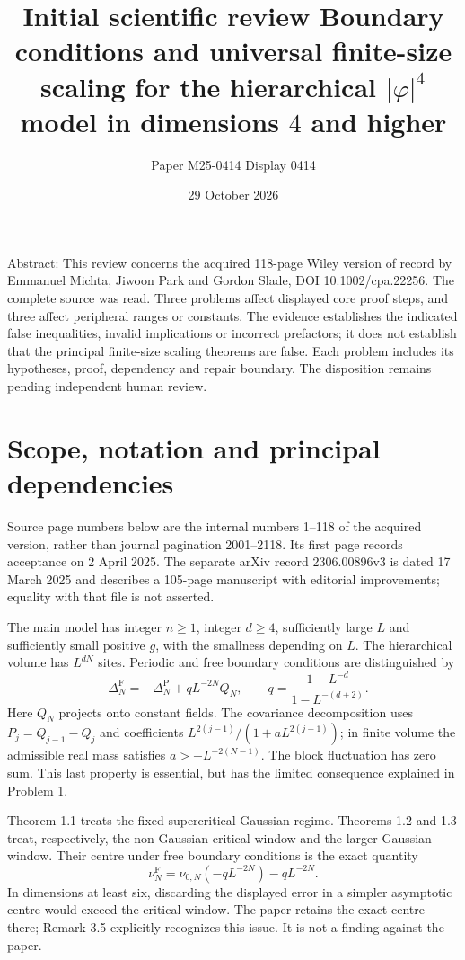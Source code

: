 \documentclass[10pt]{article}
\title{Initial scientific review
Boundary conditions and universal finite-size scaling
for the hierarchical \(|\varphi|^4\) model
in dimensions \(4\) and higher}
\author{Paper M25-0414 Display 0414}
\date{29 October 2026}
\begin{document}
\maketitle
Abstract: This review concerns the acquired 118-page Wiley version of record by Emmanuel Michta, Jiwoon Park and Gordon Slade, DOI 10.1002/cpa.22256. The complete source was read. Three problems affect displayed core proof steps, and three affect peripheral ranges or constants. The evidence establishes the indicated false inequalities, invalid implications or incorrect prefactors; it does not establish that the principal finite-size scaling theorems are false. Each problem includes its hypotheses, proof, dependency and repair boundary. The disposition remains pending independent human review.\par
\section*{Scope, notation and principal dependencies}
Source page numbers below are the internal numbers 1–118 of the acquired version, rather than journal pagination 2001–2118. Its first page records acceptance on 2 April 2025. The separate arXiv record 2306.00896v3 is dated 17 March 2025 and describes a 105-page manuscript with editorial improvements; equality with that file is not asserted.\par
The main model has integer \(n\geq1\), integer \(d\geq4\), sufficiently large \(L\) and sufficiently small positive \(g\), with the smallness depending on \(L\). The hierarchical volume has \(L^{dN}\) sites. Periodic and free boundary conditions are distinguished by \[-\Delta_N^{\mathrm F}=-\Delta_N^{\mathrm P}
       +qL^{-2N}Q_N,\qquad
 q=\frac{1-L^{-d}}{1-L^{-(d+2)}}.\] Here \(Q_N\) projects onto constant fields. The covariance decomposition uses \(P_j=Q_{j-1}-Q_j\) and coefficients \(L^{2(j-1)}/(1+aL^{2(j-1)})\); in finite volume the admissible real mass satisfies \(a>-L^{-2(N-1)}\). The block fluctuation has zero sum. This last property is essential, but has the limited consequence explained in Problem 1.\par
Theorem 1.1 treats the fixed supercritical Gaussian regime. Theorems 1.2 and 1.3 treat, respectively, the non-Gaussian critical window and the larger Gaussian window. Their centre under free boundary conditions is the exact quantity \[\nu_N^{\mathrm F}=\nu_{0,N}(-qL^{-2N})-qL^{-2N}.\] In dimensions at least six, discarding the displayed error in a simpler asymptotic centre would exceed the critical window. The paper retains the exact centre there; Remark 3.5 explicitly recognizes this issue. It is not a finding against the paper.\par
\end{document}
